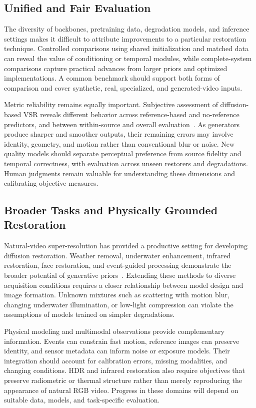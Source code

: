 \subsection{Unified and Fair Evaluation}
The diversity of backbones, pretraining data, degradation models, and inference settings makes it difficult to attribute improvements to a particular restoration technique. Controlled comparisons using shared initialization and matched data can reveal the value of conditioning or temporal modules, while complete-system comparisons capture practical advances from larger priors and optimized implementations. A common benchmark should support both forms of comparison and cover synthetic, real, specialized, and generated-video inputs.

Metric reliability remains equally important. Subjective assessment of diffusion-based VSR reveals different behavior across reference-based and no-reference predictors, and between within-source and overall evaluation~\cite{metric}. As generators produce sharper and smoother outputs, their remaining errors may involve identity, geometry, and motion rather than conventional blur or noise. New quality models should separate perceptual preference from source fidelity and temporal correctness, with evaluation across unseen restorers and degradations. Human judgments remain valuable for understanding these dimensions and calibrating objective measures.

\subsection{Broader Tasks and Physically Grounded Restoration}
Natural-video super-resolution has provided a productive setting for developing diffusion restoration. Weather removal, underwater enhancement, infrared restoration, face restoration, and event-guided processing demonstrate the broader potential of generative priors~\cite{difftta,weatherweaver,undive,hatir,flair,evdiffuser}. Extending these methods to diverse acquisition conditions requires a closer relationship between model design and image formation. Unknown mixtures such as scattering with motion blur, changing underwater illumination, or low-light compression can violate the assumptions of models trained on simpler degradations.

Physical modeling and multimodal observations provide complementary information. Events can constrain fast motion, reference images can preserve identity, and sensor metadata can inform noise or exposure models. Their integration should account for calibration errors, missing modalities, and changing conditions. HDR and infrared restoration also require objectives that preserve radiometric or thermal structure rather than merely reproducing the appearance of natural RGB video. Progress in these domains will depend on suitable data, models, and task-specific evaluation.

